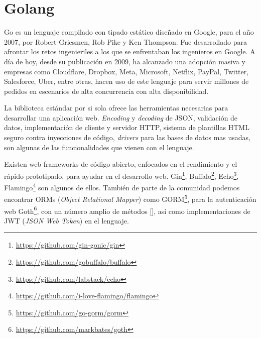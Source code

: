 




\section{Golang}

Go es un lenguaje compilado con tipado estático diseñado en Google, para el año 2007, por Robert Griesmen, Rob Pike y Ken Thompson. Fue desarrollado para afrontar los retos ingenieriles a los que se enfrentaban los ingenieros en Google. A día de hoy, desde su publicación en 2009, ha alcanzado una adopción masiva y empresas como Cloudflare, Dropbox, Meta, Microsoft, Netflix, PayPal, Twitter, Salesforce, Uber, entre otras, hacen uso de este lenguaje para servir millones de pedidos en escenarios de alta concurrencia con alta disponibilidad.                                                            

La biblioteca estándar por si sola ofrece las herramientas necesarias para desarrollar una aplicación web. \textit{Encoding} y \textit{decoding} de JSON, validación de datos, implementación de cliente y servidor HTTP, sistema de plantillas HTML seguro contra inyecciones de código, \textit{drivers} para las bases de datos mas usadas, son algunas de las funcionalidades que vienen con el lenguaje.

Existen web frameworks de código abierto, enfocados en el rendimiento y el rápido prototipado, para ayudar en el desarrollo web. Gin\footnote{\url{https://github.com/gin-gonic/gin}}, Buffalo\footnote{\url{https://github.com/gobuffalo/buffalo}}, Echo\footnote{\url{https://github.com/labstack/echo}}, Flamingo\footnote{\url{https://github.com/i-love-flamingo/flamingo}} son algunos de ellos. También de parte de la comunidad podemos encontrar ORMs (\textit{Object Relational Mapper}) como GORM\footnote{\url{https://github.com/go-gorm/gorm}}, para la autenticación web Goth\footnote{\url{https://github.com/markbates/goth}}, con un número amplio de métodos [\cite{goth}], así como implementaciones de JWT (\textit{JSON Web Token}) en el lenguaje.

